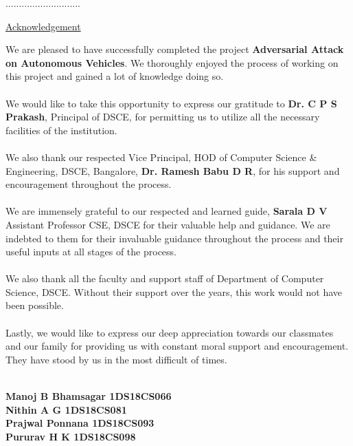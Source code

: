 \documentclass[ 12pt,a4paper,twocolumn,fleqn]{article}
\begin{document}
\hfill{............................} \\
\newpage
  \pagestyle{fancy}
\thisfancypage{%
  \setlength{\fboxsep}{20pt}\doublebox}{}
\begin{center}
\LARGE{{\underline{Acknowledgement}}} \\
\end{center}
\normalsize
We are pleased to have successfully completed the project \textbf{Adversarial Attack on Autonomous Vehicles}. We thoroughly enjoyed the process of working on this project and gained a lot of knowledge doing so.
\\
\hfill
\\
We would like to take this opportunity to express our gratitude to \textbf{Dr. C P S Prakash}, Principal of DSCE, for permitting us to utilize all the necessary facilities of the institution.
\\
\hfill
\\
We also thank our respected Vice Principal, HOD of Computer Science \& Engineering, DSCE, Bangalore,\textbf{ Dr. Ramesh Babu D R}, for his support and encouragement throughout the process.
\\
\hfill
\\
We are immensely grateful to our respected and learned guide, \textbf{Sarala D V} Assistant Professor CSE, DSCE for their valuable help and guidance. We are indebted to them for their invaluable guidance throughout the process and their useful inputs at all stages of the process.
\\
\hfill
\\
We also thank all the faculty and support staff of Department of Computer Science, DSCE. Without their support over the years, this work would not have been possible.
\\
\hfill
\\
Lastly, we would like to express our deep appreciation towards our classmates and our family for providing us with constant moral support and encouragement. They have stood by us in the most difficult of times.
\\
\hfill
\\
\begin{flushright}
\textbf{Manoj B Bhamsagar \space 1DS18CS066} \\
\textbf{Nithin A G \space 1DS18CS081} \\
\textbf{Prajwal Ponnana \space 1DS18CS093} \\
\textbf{Pururav H K \space 1DS18CS098} \\
\end{flushright}
\end{document}
